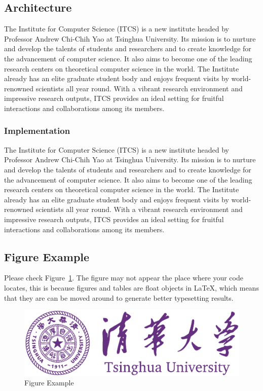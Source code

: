 \documentclass{ics}
\begin{document}
\subsection{Architecture}
\label{sec:architecture}
The Institute for Computer Science (ITCS) is a new institute headed by Professor
Andrew Chi-Chih Yao at Tsinghua University. Its mission is to nurture and
develop the talents of students and researchers and to create knowledge for the
advancement of computer science. It also aims to become one of the leading
research centers on theoretical computer science in the world. The Institute
already has an elite graduate student body and enjoys frequent visits by
world-renowned scientists all year round. With a vibrant research environment
and impressive research outputs, ITCS provides an ideal setting for fruitful
interactions and collaborations among its members.

\subsubsection{Implementation}
\label{sec:implementation}
The Institute for Computer Science (ITCS) is a new institute headed by Professor
Andrew Chi-Chih Yao at Tsinghua University. Its mission is to nurture and
develop the talents of students and researchers and to create knowledge for the
advancement of computer science. It also aims to become one of the leading
research centers on theoretical computer science in the world. The Institute
already has an elite graduate student body and enjoys frequent visits by
world-renowned scientists all year round. With a vibrant research environment
and impressive research outputs, ITCS provides an ideal setting for fruitful
interactions and collaborations among its members.

\subsection{Figure Example}
\label{sec:ref-figure}
Please check Figure~\ref{fig:example}. The figure may not appear the place where
your code locates, this is because figures and tables are float objects in
\LaTeX, which means that they are can be moved around to generate better
typesetting results.

\begin{figure}
  \centering
  \includegraphics[width=.8\linewidth]{thu-whole-logo}
  \caption{Figure Example}
  \label{fig:example}
\end{figure}
\end{document}
